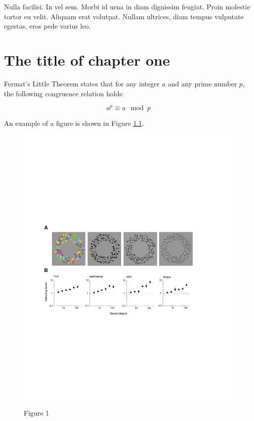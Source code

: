 \begin{savequote}[75mm]
Nulla facilisi. In vel sem. Morbi id urna in diam dignissim feugiat. Proin molestie tortor eu velit. Aliquam erat volutpat. Nullam ultrices, diam tempus vulputate egestas, eros pede varius leo.
\end{savequote}

\chapter{The title of chapter one}

 Fermat's Little Theorem states that for any integer $a$ and any prime number $p$, the following congruence relation holds:

\begin{equation}
    a^p\equiv a\mod p
\end{equation}

An example of a figure is shown in Figure \ref{fig:fig1}.

\begin{figure}[H]\centering
    \includegraphics[width=\textwidth]{figures/fig1.pdf}
    \caption[
        Figure 1
    ]{
        Figure 1
    }\label{fig:fig1}
\end{figure}


